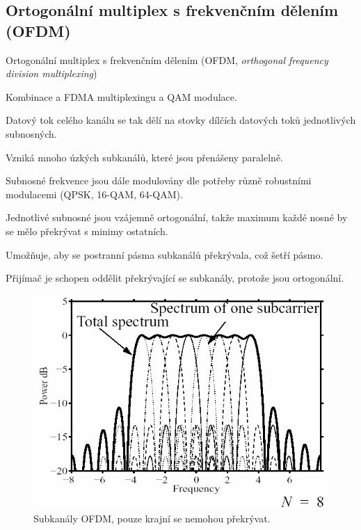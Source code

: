 \subsection{Ortogonální multiplex s frekvenčním dělením (OFDM)}

\begin{compactitem}
    \item Ortogonální multiplex s frekvenčním dělením (OFDM, \textit{orthogonal frequency division multiplexing})

    \item Kombinace a FDMA multiplexingu a QAM modulace. \begin{compactitem}
        \item Datový tok celého kanálu se tak dělí na stovky dílčích datových toků jednotlivých subnosných.
        \item Vzniká mnoho úzkých subkanálů, které jsou přenášeny paralelně.
    \end{compactitem}

    \item Subnosné frekvence jsou dále modulovány dle potřeby různě robustními modulacemi (QPSK, 16-QAM, 64-QAM).

    \item Jednotlivé subnosné jsou vzájemně ortogonální, takže maximum každé nosné by se mělo překrývat s minimy ostatních.

    \item Umožňuje, aby se postranní pásma subkanálů překrývala, což šetří pásmo.

    \item Přijímač je schopen oddělit překrývající se subkanály, protože jsou ortogonální.
\end{compactitem}

\begin{figure}[H]
    \centering
    \includegraphics[width=0.6\linewidth]{ofdm.png}
    \caption{Subkanály OFDM, pouze krajní se nemohou překrývat.}
\end{figure}

